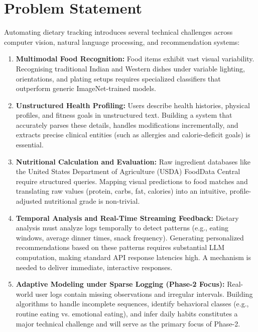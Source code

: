 \documentclass[12pt,a4paper,oneside]{report}
\begin{document}
\section{Problem Statement}
Automating dietary tracking introduces several technical challenges across computer vision, natural language processing, and recommendation systems:
\begin{enumerate}
    \item \textbf{Multimodal Food Recognition:} Food items exhibit vast visual variability. Recognising traditional Indian and Western dishes under variable lighting, orientations, and plating setups requires specialized classifiers that outperform generic ImageNet-trained models.
    \item \textbf{Unstructured Health Profiling:} Users describe health histories, physical profiles, and fitness goals in unstructured text. Building a system that accurately parses these details, handles modifications incrementally, and extracts precise clinical entities (such as allergies and calorie-deficit goals) is essential.
    \item \textbf{Nutritional Calculation and Evaluation:} Raw ingredient databases like the United States Department of Agriculture (USDA) FoodData Central require structured queries. Mapping visual predictions to food matches and translating raw values (protein, carbs, fat, calories) into an intuitive, profile-adjusted nutritional grade is non-trivial.
    \item \textbf{Temporal Analysis and Real-Time Streaming Feedback:} Dietary analysis must analyze logs temporally to detect patterns (e.g., eating windows, average dinner times, snack frequency). Generating personalized recommendations based on these patterns requires substantial LLM computation, making standard API response latencies high. A mechanism is needed to deliver immediate, interactive responses.
    \item \textbf{Adaptive Modeling under Sparse Logging (Phase-2 Focus):} Real-world user logs contain missing observations and irregular intervals. Building algorithms to handle incomplete sequences, identify behavioral classes (e.g., routine eating vs. emotional eating), and infer daily habits constitutes a major technical challenge and will serve as the primary focus of Phase-2.
\end{enumerate}
\end{document}
